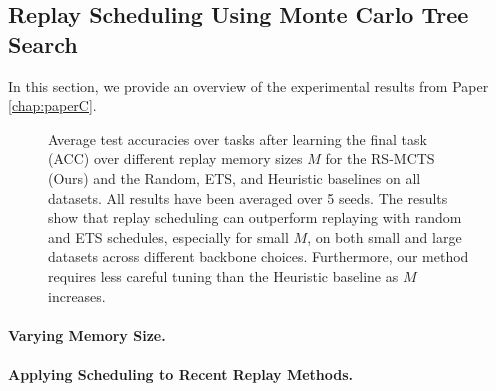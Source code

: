 \subsection{Replay Scheduling Using Monte Carlo Tree Search}

In this section, we provide an overview of the experimental results from Paper \ref{chap:paperC}. 

\begin{figure}[t]
	\centering
	\setlength{\figwidth}{0.36\textwidth}
	\setlength{\figheight}{.16\textheight}
	
	\vspace{-4mm}
	\caption{Average test accuracies over tasks after learning the final task (ACC) over different replay memory sizes $M$ for the RS-MCTS (Ours) and the Random, ETS, and Heuristic baselines on all datasets.
		All results have been averaged over 5 seeds. The results show that replay scheduling can outperform replaying with random and ETS schedules, %
		especially for small $M$, on both small and large datasets across different backbone choices. Furthermore, our method requires less careful tuning than the Heuristic baseline as $M$ increases.
	}
	\vspace{-3mm}
	\label{fig:acc_over_replay_memory_size}
\end{figure}

\paragraph{Varying Memory Size.}


\paragraph{Applying Scheduling to Recent Replay Methods.} 



